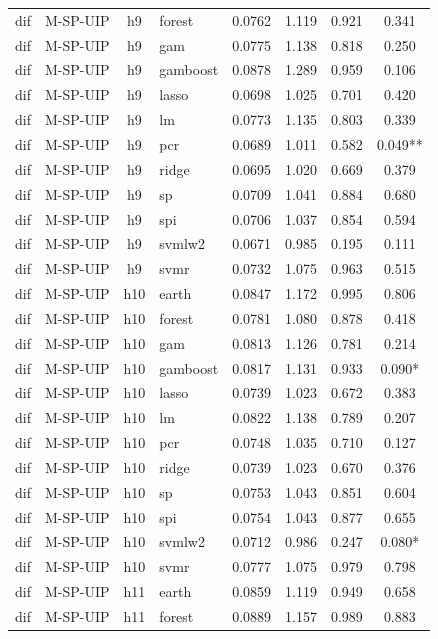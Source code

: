 \begin{ThreePartTable}
\begin{longtable}[t]{llclcccc}
dif & M-SP-UIP & h9 & forest & 0.0762 & 1.119 & 0.921 & 0.341\\
dif & M-SP-UIP & h9 & gam & 0.0775 & 1.138 & 0.818 & 0.250\\
dif & M-SP-UIP & h9 & gamboost & 0.0878 & 1.289 & 0.959 & 0.106\\
dif & M-SP-UIP & h9 & lasso & 0.0698 & 1.025 & 0.701 & 0.420\\
dif & M-SP-UIP & h9 & lm & 0.0773 & 1.135 & 0.803 & 0.339\\
dif & M-SP-UIP & h9 & pcr & 0.0689 & 1.011 & 0.582 & 0.049**\\
dif & M-SP-UIP & h9 & ridge & 0.0695 & 1.020 & 0.669 & 0.379\\
dif & M-SP-UIP & h9 & sp & 0.0709 & 1.041 & 0.884 & 0.680\\
dif & M-SP-UIP & h9 & spi & 0.0706 & 1.037 & 0.854 & 0.594\\
dif & M-SP-UIP & h9 & svmlw2 & 0.0671 & 0.985 & 0.195 & 0.111\\
dif & M-SP-UIP & h9 & svmr & 0.0732 & 1.075 & 0.963 & 0.515\\
\addlinespace
dif & M-SP-UIP & h10 & earth & 0.0847 & 1.172 & 0.995 & 0.806\\
dif & M-SP-UIP & h10 & forest & 0.0781 & 1.080 & 0.878 & 0.418\\
dif & M-SP-UIP & h10 & gam & 0.0813 & 1.126 & 0.781 & 0.214\\
dif & M-SP-UIP & h10 & gamboost & 0.0817 & 1.131 & 0.933 & 0.090*\\
dif & M-SP-UIP & h10 & lasso & 0.0739 & 1.023 & 0.672 & 0.383\\
dif & M-SP-UIP & h10 & lm & 0.0822 & 1.138 & 0.789 & 0.207\\
dif & M-SP-UIP & h10 & pcr & 0.0748 & 1.035 & 0.710 & 0.127\\
dif & M-SP-UIP & h10 & ridge & 0.0739 & 1.023 & 0.670 & 0.376\\
dif & M-SP-UIP & h10 & sp & 0.0753 & 1.043 & 0.851 & 0.604\\
dif & M-SP-UIP & h10 & spi & 0.0754 & 1.043 & 0.877 & 0.655\\
dif & M-SP-UIP & h10 & svmlw2 & 0.0712 & 0.986 & 0.247 & 0.080*\\
dif & M-SP-UIP & h10 & svmr & 0.0777 & 1.075 & 0.979 & 0.798\\
\addlinespace
dif & M-SP-UIP & h11 & earth & 0.0859 & 1.119 & 0.949 & 0.658\\
dif & M-SP-UIP & h11 & forest & 0.0889 & 1.157 & 0.989 & 0.883\\

\end{longtable}
\end{ThreePartTable}
